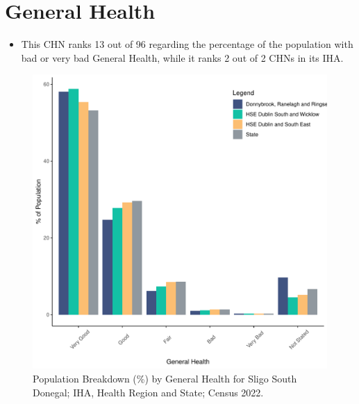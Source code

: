 \documentclass{article}
\begin{document}
\pagebreak

\section{General Health}\label{sect:GenHealth}
\begin{itemize}
\item  This CHN ranks  13 out of 96 regarding the percentage of the population with bad or very bad General Health, while it ranks   2 out of 2 CHNs in its IHA.
\end{itemize}
\begin{figure}[h]
	\centering
	\includegraphics[width = 150mm]{../figures/GenED.pdf}
	\caption{Population Breakdown (\%) by General Health for Sligo South Donegal; IHA, Health Region and State;  Census 2022.}
	\label{fig:2ae19629-1a6a-13a3-e055-000000000001}
	\end{figure}
\end{document}
